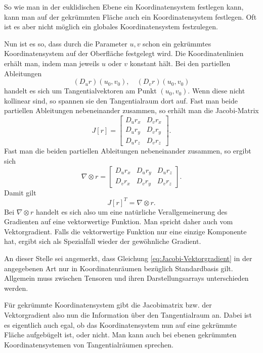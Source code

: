 \documentclass[a4paper,12pt,fleqn,dvipdfmx]{article}
\begin{document}
So wie man in der euklidischen Ebene ein Koordinatensystem
festlegen kann, kann man auf der gekrümmten Fläche auch
ein Koordinatensystem festlegen. Oft ist es aber nicht möglich
ein globales Koordinatensystem festzulegen.

Nun ist es so, dass durch die Parameter $u,v$ schon ein
gekrümmtes Koordinatensystem auf der Oberfläche festgelegt wird.
Die Koordinatenlinien erhält man, indem man jeweils $u$ oder $v$
konstant hält. Bei den partiellen Ableitungen
\begin{equation}
(D_u r)(u_0,v_0),\quad (D_v r)(u_0,v_0)
\end{equation}
handelt es sich um Tangentialvektoren am Punkt $(u_0,v_0)$.
Wenn diese nicht kollinear sind, so spannen sie den
Tangentialraum dort auf. Fast man beide partiellen Ableitungen
nebeneinander zusammen, so erhält man die Jacobi-Matrix
\begin{equation}
J[r] = \begin{bmatrix}
D_u r_x & D_v r_x\\
D_u r_y & D_v r_y\\
D_u r_z & D_v r_z
\end{bmatrix}.
\end{equation}
Fast man die beiden partiellen Ableitungen nebeneinander
zusammen, so ergibt sich
\begin{equation}
\nabla\otimes r = \begin{bmatrix}
D_u r_x & D_u r_y & D_u r_z\\
D_v r_x & D_v r_y & D_v r_z
\end{bmatrix}.
\end{equation}
Damit gilt
\begin{equation}\label{eq:Jacobi-Vektorgradient}
J[r]^T=\nabla\otimes r.
\end{equation}
Bei $\nabla\otimes r$
handelt es sich also um eine natürliche Verallgemeinerung
des Gradienten auf eine vektorwertige Funktion. Man spricht
daher auch vom Vektorgradient. Falls die vektorwertige Funktion
nur eine einzige Komponente hat, ergibt sich als Spezialfall
wieder der gewöhnliche Gradient.

An dieser Stelle sei angemerkt, dass Gleichung
\eqref{eq:Jacobi-Vektorgradient} in der angegebenen Art nur
in Koordinatenräumen bezüglich Standardbasis gilt.
Allgemein muss zwischen Tensoren und ihren Darstellungsarrays
unterschieden werden. 

Für gekrümmte Koordinatensystem gibt die Jacobimatrix bzw. der
Vektorgradient also nun die Information über den Tangentialraum
an. Dabei ist es eigentlich auch egal, ob das Koordinatensystem nun
auf eine gekrümmte Fläche aufgebügelt ist, oder nicht. Man kann
auch bei ebenen gekrümmten Koordinatensystemen von Tangentialräumen
sprechen.
\end{document}

